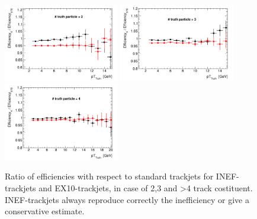 \begin{figure}[tp]
\centering
\includegraphics[width=0.45\textwidth]{figure/trackjet/T7/eff_ratio_2.pdf}
\includegraphics[width=0.45\textwidth]{figure/trackjet/T7/eff_ratio_3.pdf}
\includegraphics[width=0.45\textwidth]{figure/trackjet/T7/eff_ratio_4.pdf}
\caption{Ratio of efficiencies with respect to standard trackjets for INEF-trackjets and EX10-trackjets, in case of 2,3 and >4 track costituent.
	INEF-trackjets always reproduce correctly the inefficiency or give a conservative estimate.}

\label{fig:}
\end{figure}    

